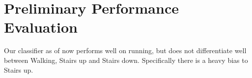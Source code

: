 \section{Preliminary Performance Evaluation}
\label{sec:perf-eval}

Our classifier as of now performs well on running, but does not differentiate well between Walking, Stairs up and Stairs down. Specifically there is a heavy bias to Stairs up.